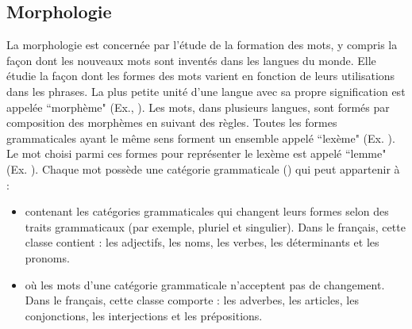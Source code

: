\documentclass{KodeBook}
\begin{document}
\subsection{Morphologie}

La morphologie est concernée par l'étude de la formation des mots, y compris la façon dont les nouveaux mots sont inventés dans les langues du monde.
Elle étudie la façon dont les formes des mots varient en fonction de leurs utilisations dans les phrases.
La plus petite unité d'une langue avec sa propre signification est appelée ``morphème" (Ex., ). 
Les mots, dans plusieurs langues, sont formés par composition des morphèmes en suivant des règles. 
Toutes les formes grammaticales ayant le même sens forment un ensemble appelé ``lexème" (Ex. ). 
Le mot choisi parmi ces formes pour représenter le lexème est appelé ``lemme" (Ex. ).
Chaque mot possède une catégorie grammaticale () qui peut appartenir à :
\begin{itemize}
	\item {} contenant les catégories grammaticales qui changent leurs formes selon des traits grammaticaux (par exemple, pluriel et singulier).
	Dans le français, cette classe contient : les adjectifs, les noms, les verbes, les déterminants et les pronoms.
	\item {} où les mots d'une catégorie grammaticale n'acceptent pas de changement.
	Dans le français, cette classe comporte : les adverbes, les articles, les conjonctions, les interjections et les prépositions.
\end{itemize}
\end{document}
